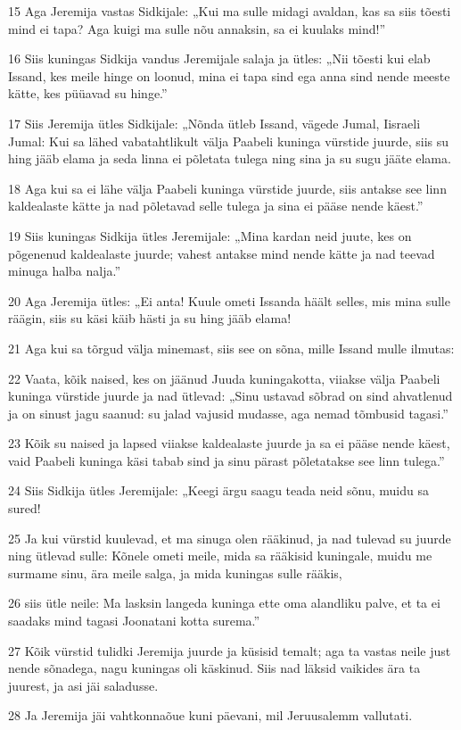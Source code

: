 \par 15 Aga Jeremija vastas Sidkijale: „Kui ma sulle midagi avaldan, kas sa siis tõesti mind ei tapa? Aga kuigi ma sulle nõu annaksin, sa ei kuulaks mind!”
\par 16 Siis kuningas Sidkija vandus Jeremijale salaja ja ütles: „Nii tõesti kui elab Issand, kes meile hinge on loonud, mina ei tapa sind ega anna sind nende meeste kätte, kes püüavad su hinge.”
\par 17 Siis Jeremija ütles Sidkijale: „Nõnda ütleb Issand, vägede Jumal, Iisraeli Jumal: Kui sa lähed vabatahtlikult välja Paabeli kuninga vürstide juurde, siis su hing jääb elama ja seda linna ei põletata tulega ning sina ja su sugu jääte elama.
\par 18 Aga kui sa ei lähe välja Paabeli kuninga vürstide juurde, siis antakse see linn kaldealaste kätte ja nad põletavad selle tulega ja sina ei pääse nende käest.”
\par 19 Siis kuningas Sidkija ütles Jeremijale: „Mina kardan neid juute, kes on põgenenud kaldealaste juurde; vahest antakse mind nende kätte ja nad teevad minuga halba nalja.”
\par 20 Aga Jeremija ütles: „Ei anta! Kuule ometi Issanda häält selles, mis mina sulle räägin, siis su käsi käib hästi ja su hing jääb elama!
\par 21 Aga kui sa tõrgud välja minemast, siis see on sõna, mille Issand mulle ilmutas:
\par 22 Vaata, kõik naised, kes on jäänud Juuda kuningakotta, viiakse välja Paabeli kuninga vürstide juurde ja nad ütlevad: „Sinu ustavad sõbrad on sind ahvatlenud ja on sinust jagu saanud: su jalad vajusid mudasse, aga nemad tõmbusid tagasi.”
\par 23 Kõik su naised ja lapsed viiakse kaldealaste juurde ja sa ei pääse nende käest, vaid Paabeli kuninga käsi tabab sind ja sinu pärast põletatakse see linn tulega.”
\par 24 Siis Sidkija ütles Jeremijale: „Keegi ärgu saagu teada neid sõnu, muidu sa sured!
\par 25 Ja kui vürstid kuulevad, et ma sinuga olen rääkinud, ja nad tulevad su juurde ning ütlevad sulle: Kõnele ometi meile, mida sa rääkisid kuningale, muidu me surmame sinu, ära meile salga, ja mida kuningas sulle rääkis,
\par 26 siis ütle neile: Ma lasksin langeda kuninga ette oma alandliku palve, et ta ei saadaks mind tagasi Joonatani kotta surema.”
\par 27 Kõik vürstid tulidki Jeremija juurde ja küsisid temalt; aga ta vastas neile just nende sõnadega, nagu kuningas oli käskinud. Siis nad läksid vaikides ära ta juurest, ja asi jäi saladusse.
\par 28 Ja Jeremija jäi vahtkonnaõue kuni päevani, mil Jeruusalemm vallutati.

